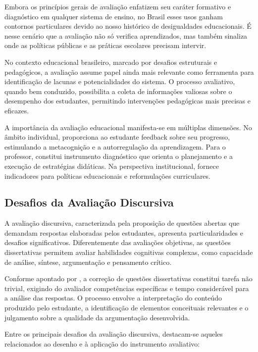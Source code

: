 Embora os princípios gerais de avaliação enfatizem seu caráter formativo e diagnóstico em qualquer sistema de ensino, no Brasil esses usos ganham contornos particulares devido ao nosso histórico de desigualdades educacionais. É nesse cenário que a avaliação não só verifica aprendizados, mas também sinaliza onde as políticas públicas e as práticas escolares precisam intervir.

No contexto educacional brasileiro, marcado por desafios estruturais e pedagógicos, a avaliação assume papel ainda mais relevante como ferramenta para identificação de lacunas e potencialidades do sistema. O processo avaliativo, quando bem conduzido, possibilita a coleta de informações valiosas sobre o desempenho dos estudantes, permitindo intervenções pedagógicas mais precisas e eficazes.

A importância da avaliação educacional manifesta-se em múltiplas dimensões. No âmbito individual, proporciona ao estudante feedback sobre seu progresso, estimulando a metacognição e a autorregulação da aprendizagem. Para o professor, constitui instrumento diagnóstico que orienta o planejamento e a execução de estratégias didáticas. Na perspectiva institucional, fornece indicadores para políticas educacionais e reformulações curriculares.

\subsection{Desafios da Avaliação Discursiva}

A avaliação discursiva, caracterizada pela proposição de questões abertas que demandam respostas elaboradas pelos estudantes, apresenta particularidades e desafios significativos. Diferentemente das avaliações objetivas, as questões dissertativas permitem avaliar habilidades cognitivas complexas, como capacidade de análise, síntese, argumentação e pensamento crítico.

Conforme apontado por , a correção de questões dissertativas constitui tarefa não trivial, exigindo do avaliador competências específicas e tempo considerável para a análise das respostas. O processo envolve a interpretação do conteúdo produzido pelo estudante, a identificação de elementos conceituais relevantes e o julgamento sobre a qualidade da argumentação desenvolvida.

Entre os principais desafios da avaliação discursiva, destacam-se aqueles relacionados ao desenho e à aplicação do instrumento avaliativo:

